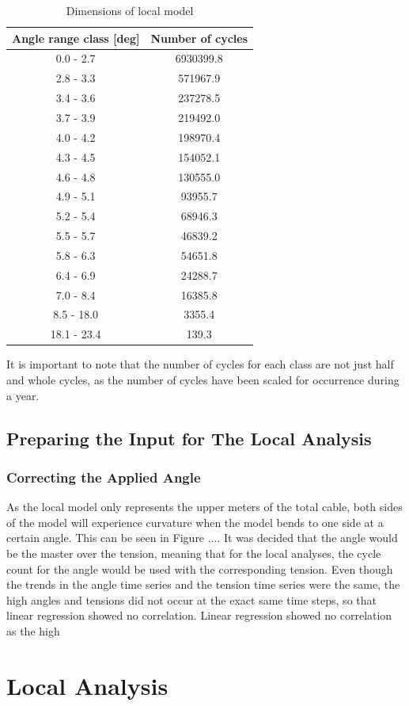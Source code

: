 \begin{table} [H]
\centering
\begin{tabular}{ |c|c|}
\hline
Angle range class [deg] & Number of cycles \\
 \hline
 \hline
0.0 - 2.7 & 6930399.8\\

2.8 - 3.3 & 571967.9\\
 
3.4 - 3.6 & 237278.5 \\
 
3.7 - 3.9& 219492.0  \\

4.0 - 4.2& 198970.4  \\

4.3  - 4.5 & 154052.1  \\

4.6 - 4.8 & 130555.0 \\

4.9 - 5.1 & 93955.7 \\

5.2 - 5.4 & 68946.3 \\

5.5 - 5.7 & 46839.2 \\

5.8 - 6.3 & 54651.8 \\

6.4 - 6.9 & 24288.7 \\

7.0 - 8.4 & 16385.8 \\

8.5 - 18.0 & 3355.4 \\

18.1 - 23.4 & 139.3  \\

 \hline
\end{tabular}
\caption{Dimensions of local model}
\label{table:angleclass}
\end{table} 
\noindent It is important to note that the number of cycles for each class are not just half and whole cycles, as the number of cycles have been scaled for occurrence during a year.\newline 
\newline
\subsection{Preparing the Input for The Local Analysis}
\subsubsection{Correcting the Applied Angle}
As the local model only represents the upper meters of the total cable, both sides of the model will experience curvature when the model bends to one side at a certain angle. This can be seen in Figure ....
\noindent  It was decided that the angle would be the master over the tension, meaning that for the local analyses, the cycle count for the angle would be used with the corresponding tension. Even though the trends in the angle time series and the tension time series were the same, the high angles and tensions did not occur at the exact same time steps, so that linear regression showed no correlation.   Linear regression showed no correlation as the high 


\section{Local Analysis}
